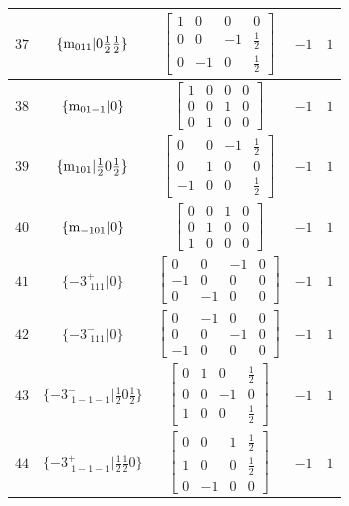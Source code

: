 \documentclass[fleqn,8pt]{jsarticle}
\begin{document}
\begin{longtable}{ccccc}
$ 37 $ & $ \{{\rm m}_{011}|0 \frac{1}{2} \frac{1}{2}\} $ & $ \begin{bmatrix} 1 & 0 & 0 & 0 \\ 0 & 0 & -1 & \frac{1}{2} \\ 0 & -1 & 0 & \frac{1}{2} \end{bmatrix} $ & $ -1 $ & $ 1 $ \\ \hline
$ 38 $ & $ \{{\rm m}_{01-1}|0\} $ & $ \begin{bmatrix} 1 & 0 & 0 & 0 \\ 0 & 0 & 1 & 0 \\ 0 & 1 & 0 & 0 \end{bmatrix} $ & $ -1 $ & $ 1 $ \\ \hline
$ 39 $ & $ \{{\rm m}_{101}|\frac{1}{2} 0 \frac{1}{2}\} $ & $ \begin{bmatrix} 0 & 0 & -1 & \frac{1}{2} \\ 0 & 1 & 0 & 0 \\ -1 & 0 & 0 & \frac{1}{2} \end{bmatrix} $ & $ -1 $ & $ 1 $ \\ \hline
$ 40 $ & $ \{{\rm m}_{-101}|0\} $ & $ \begin{bmatrix} 0 & 0 & 1 & 0 \\ 0 & 1 & 0 & 0 \\ 1 & 0 & 0 & 0 \end{bmatrix} $ & $ -1 $ & $ 1 $ \\ \hline
$ 41 $ & $ \{-3^{+}_{\,\,111}|0\} $ & $ \begin{bmatrix} 0 & 0 & -1 & 0 \\ -1 & 0 & 0 & 0 \\ 0 & -1 & 0 & 0 \end{bmatrix} $ & $ -1 $ & $ 1 $ \\ \hline
$ 42 $ & $ \{-3^{-}_{\,\,111}|0\} $ & $ \begin{bmatrix} 0 & -1 & 0 & 0 \\ 0 & 0 & -1 & 0 \\ -1 & 0 & 0 & 0 \end{bmatrix} $ & $ -1 $ & $ 1 $ \\ \hline
$ 43 $ & $ \{-3^{-}_{\,\,1-1-1}|\frac{1}{2} 0 \frac{1}{2}\} $ & $ \begin{bmatrix} 0 & 1 & 0 & \frac{1}{2} \\ 0 & 0 & -1 & 0 \\ 1 & 0 & 0 & \frac{1}{2} \end{bmatrix} $ & $ -1 $ & $ 1 $ \\ \hline
$ 44 $ & $ \{-3^{+}_{\,\,1-1-1}|\frac{1}{2} \frac{1}{2} 0\} $ & $ \begin{bmatrix} 0 & 0 & 1 & \frac{1}{2} \\ 1 & 0 & 0 & \frac{1}{2} \\ 0 & -1 & 0 & 0 \end{bmatrix} $ & $ -1 $ & $ 1 $ \\ \hline

\end{longtable}
\end{document}
